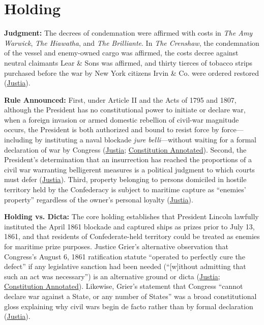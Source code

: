 \documentclass[12pt]{article}
\begin{document}
\section{Holding}

\textbf{Judgment:} The decrees of condemnation were affirmed with costs in \textit{The Amy Warwick}, \textit{The Hiawatha}, and \textit{The Brilliante}. In \textit{The Crenshaw}, the condemnation of the vessel and enemy-owned cargo was affirmed, the costs decree against neutral claimants Lear \& Sons was affirmed, and thirty tierces of tobacco strips purchased before the war by New York citizens Irvin \& Co. were ordered restored (\href{https://supreme.justia.com/cases/federal/us/67/635/}{Justia}).

\textbf{Rule Announced:} First, under Article II and the Acts of 1795 and 1807, although the President has no constitutional power to initiate or declare war, when a foreign invasion or armed domestic rebellion of civil-war magnitude occurs, the President is both authorized and bound to resist force by force---including by instituting a naval blockade \textit{jure belli}---without waiting for a formal declaration of war by Congress (\href{https://supreme.justia.com/cases/federal/us/67/635/}{Justia}; \href{https://www.law.cornell.edu/constitution-conan/article-1/section-8/clause-1/civil-war-war-powers-and-the-prize-cases}{Constitution Annotated}). Second, the President's determination that an insurrection has reached the proportions of a civil war warranting belligerent measures is a political judgment to which courts must defer (\href{https://supreme.justia.com/cases/federal/us/67/635/}{Justia}). Third, property belonging to persons domiciled in hostile territory held by the Confederacy is subject to maritime capture as ``enemies' property'' regardless of the owner's personal loyalty (\href{https://supreme.justia.com/cases/federal/us/67/635/}{Justia}).

\textbf{Holding vs. Dicta:} The core holding establishes that President Lincoln lawfully instituted the April 1861 blockade and captured ships as prizes prior to July 13, 1861, and that residents of Confederate-held territory could be treated as enemies for maritime prize purposes. Justice Grier's alternative observation that Congress's August 6, 1861 ratification statute ``operated to perfectly cure the defect'' if any legislative sanction had been needed (``[w]ithout admitting that such an act was necessary'') is an alternative ground or dicta (\href{https://supreme.justia.com/cases/federal/us/67/635/}{Justia}; \href{https://www.law.cornell.edu/constitution-conan/article-2/section-2/clause-1/prize-cases-and-commander-in-chief-clause}{Constitution Annotated}). Likewise, Grier's statement that Congress ``cannot declare war against a State, or any number of States'' was a broad constitutional gloss explaining why civil wars begin de facto rather than by formal declaration (\href{https://supreme.justia.com/cases/federal/us/67/635/}{Justia}).
\end{document}

